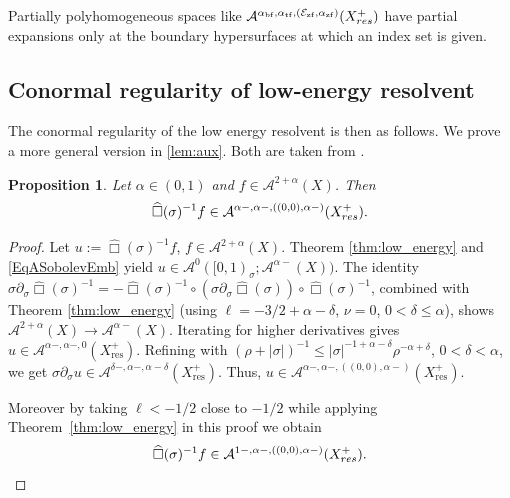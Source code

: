 \documentclass[10pt,a4paper,reqno]{amsart}
\newcommand{\tface}{{\mathrm{tf}}}
\newcommand{\zface}{{\mathrm{zf}}}
\newcommand{\bface}{{\mathrm{bf}}}
\newtheorem{proposition}[theorem]{Proposition}
\theoremstyle{definition}
\theoremstyle{remark}
\numberwithin{equation}{section}
\newcommand{\cA}{\mathcal A}
\newcommand{\cE}{\mathcal E}
\newcommand{\wh}{\widehat}
\begin{document}
Partially polyhomogeneous spaces like $\cA^{\alpha_\bface,\alpha_\tface,(\cE_\zface,\alpha_\zface)}(X^+_{\rm res})$ have partial expansions only at the boundary hypersurfaces at which an index set is given. 

\subsection{Conormal regularity of low-energy resolvent}
The conormal regularity of the low energy resolvent is then as follows. We prove a more general version in \cref*{lem:aux}. Both are taken from \cite[Proposition 2.14]{Hin22}.

\begin{proposition}
\label{prop:1}
  Let $\alpha\in(0,1)$ and $f\in\cA^{2+\alpha}(X)$. Then
  \begin{equation}
   \wh\Box(\sigma)^{-1}f \in \cA^{\alpha-,\alpha-,((0,0),\alpha-)}(X^+_{\rm res}).
  \end{equation}
  \end{proposition}

\begin{proof}
Let $u := \wh\Box(\sigma)^{-1}f$, $f \in \mathcal{A}^{2+\alpha}(X)$. Theorem \ref{thm:low_energy} and \eqref{EqASobolevEmb} yield $u \in \mathcal{A}^0([0,1)_\sigma; \mathcal{A}^{\alpha-}(X))$. The identity $\sigma\partial_\sigma\wh\Box(\sigma)^{-1} = -\wh\Box(\sigma)^{-1} \circ (\sigma\partial_\sigma\wh\Box(\sigma)) \circ \wh\Box(\sigma)^{-1}$, combined with Theorem \ref{thm:low_energy} (using $\ell = -3/2 + \alpha - \delta$, $\nu = 0$, $0 < \delta \leq \alpha$), shows $\mathcal{A}^{2+\alpha}(X) \to \mathcal{A}^{\alpha-}(X)$. Iterating for higher derivatives gives $u \in \mathcal{A}^{\alpha-,\alpha-,0}(X^+_\text{res})$. Refining with $(\rho + |\sigma|)^{-1} \leq |\sigma|^{-1+\alpha-\delta}\rho^{-\alpha+\delta}$, $0 < \delta < \alpha$, we get $\sigma\partial_\sigma u \in \mathcal{A}^{\delta-,\alpha-,\alpha-\delta}(X^+_\text{res})$. Thus, $u \in \mathcal{A}^{\alpha-,\alpha-,((0,0),\alpha-)}(X^+_\text{res})$.

Moreover by taking $\ell< -1/2$ close to $-1/2$ while applying Theorem~\ref{thm:low_energy} in this proof we obtain 
\[\wh\Box(\sigma)^{-1}f \in \cA^{1-,\alpha-,((0,0),\alpha-)}(X^+_{\rm res}).\]
\end{proof}
\end{document}
